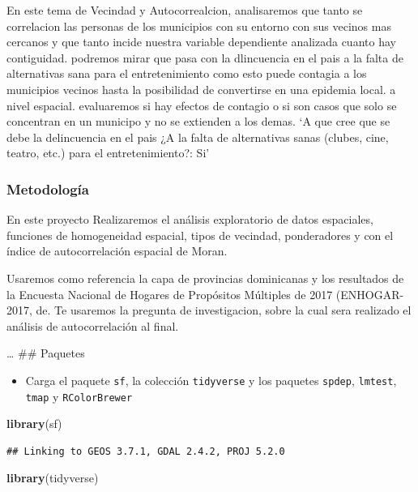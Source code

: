 \documentclass[11pt,]{article}
\newenvironment{Shaded}{\begin{snugshade}}{\end{snugshade}}
\newcommand{\KeywordTok}[1]{\textcolor[rgb]{0.13,0.29,0.53}{\textbf{#1}}}
\newcommand{\NormalTok}[1]{#1}
\providecommand{\tightlist}{%
\setlength{\itemsep}{0pt}\setlength{\parskip}{0pt}}
\begin{document}
En este tema de Vecindad y Autocorrealcion, analisaremos que tanto se
correlacion las personas de los municipios con su entorno con sus
vecinos mas cercanos y que tanto incide nuestra variable dependiente
analizada cuanto hay contiguidad. podremos mirar que pasa con la
dlincuencia en el pais a la falta de alternativas sana para el
entretenimiento como esto puede contagia a los municipios vecinos hasta
la posibilidad de convertirse en una epidemia local. a nivel espacial.
evaluaremos si hay efectos de contagio o si son casos que solo se
concentran en un municipo y no se extienden a los demas. `A que cree que
se debe la delincuencia en el pais ¿A la falta de alternativas sanas
(clubes, cine, teatro, etc.) para el entretenimiento?: Si'

\subsubsection{Metodología}\label{metodologuxeda}

En este proyecto Realizaremos el análisis exploratorio de datos
espaciales, funciones de homogeneidad espacial, tipos de vecindad,
ponderadores y con el índice de autocorrelación espacial de Moran.

Usaremos como referencia la capa de provincias dominicanas y los
resultados de la Encuesta Nacional de Hogares de Propósitos Múltiples de
2017 (ENHOGAR-2017, de. Te usaremos la pregunta de investigacion, sobre
la cual sera realizado el análisis de autocorrelación al final.

\ldots
\#\# Paquetes

\begin{itemize}
\tightlist
\item
  Carga el paquete \texttt{sf}, la colección \texttt{tidyverse} y los
  paquetes \texttt{spdep}, \texttt{lmtest}, \texttt{tmap} y
  \texttt{RColorBrewer}
\end{itemize}

\begin{Shaded}
\begin{Highlighting}[]
\KeywordTok{library}\NormalTok{(sf)}
\end{Highlighting}
\end{Shaded}

\begin{verbatim}
## Linking to GEOS 3.7.1, GDAL 2.4.2, PROJ 5.2.0
\end{verbatim}

\begin{Shaded}
\begin{Highlighting}[]
\KeywordTok{library}\NormalTok{(tidyverse)}
\end{Highlighting}
\end{Shaded}
\end{document}
